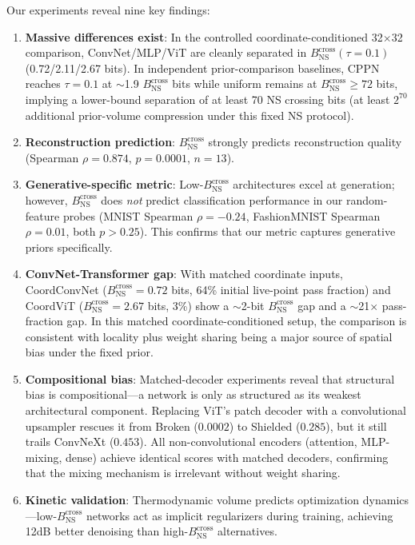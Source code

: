 \documentclass{article}
\begin{document}
Our experiments reveal nine key findings:
\begin{enumerate}
    \item \textbf{Massive differences exist}: In the controlled coordinate-conditioned 32$\times$32 comparison, ConvNet/MLP/ViT are cleanly separated in $B_{\text{NS}}^{\text{cross}}(\tau{=}0.1)$ (0.72/2.11/2.67 bits). In independent prior-comparison baselines, CPPN reaches $\tau=0.1$ at $\sim$1.9 $B_{\text{NS}}^{\text{cross}}$ bits while uniform remains at $B_{\text{NS}}^{\text{cross}} \ge 72$ bits, implying a lower-bound separation of at least 70 NS crossing bits (at least $2^{70}$ additional prior-volume compression under this fixed NS protocol).
    \item \textbf{Reconstruction prediction}: $B_{\text{NS}}^{\text{cross}}$ strongly predicts reconstruction quality (Spearman $\rho = 0.874$, $p = 0.0001$, $n=13$).
    \item \textbf{Generative-specific metric}: Low-$B_{\text{NS}}^{\text{cross}}$ architectures excel at generation; however, $B_{\text{NS}}^{\text{cross}}$ does \emph{not} predict classification performance in our random-feature probes (MNIST Spearman $\rho=-0.24$, FashionMNIST Spearman $\rho=0.01$, both $p>0.25$). This confirms that our metric captures generative priors specifically.
    \item \textbf{ConvNet-Transformer gap}: With matched coordinate inputs, CoordConvNet ($B_{\text{NS}}^{\text{cross}}=0.72$ bits, 64\% initial live-point pass fraction) and CoordViT ($B_{\text{NS}}^{\text{cross}}=2.67$ bits, 3\%) show a $\sim$2-bit $B_{\text{NS}}^{\text{cross}}$ gap and a $\sim$21$\times$ pass-fraction gap. In this matched coordinate-conditioned setup, the comparison is consistent with locality plus weight sharing being a major source of spatial bias under the fixed prior.
    \item \textbf{Compositional bias}: Matched-decoder experiments reveal that structural bias is compositional---a network is only as structured as its weakest architectural component. Replacing ViT's patch decoder with a convolutional upsampler rescues it from Broken ($0.0002$) to Shielded ($0.285$), but it still trails ConvNeXt ($0.453$). All non-convolutional encoders (attention, MLP-mixing, dense) achieve identical scores with matched decoders, confirming that the mixing mechanism is irrelevant without weight sharing.
    \item \textbf{Kinetic validation}: Thermodynamic volume predicts optimization dynamics---low-$B_{\text{NS}}^{\text{cross}}$ networks act as implicit regularizers during training, achieving 12dB better denoising than high-$B_{\text{NS}}^{\text{cross}}$ alternatives.

\end{enumerate}
\end{document}
